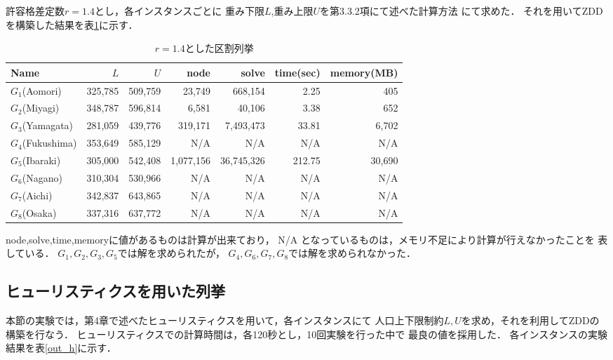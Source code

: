 許容格差定数$r=1.4$とし，各インスタンスごとに
重み下限$L$,重み上限$U$を第3.3.2項にて述べた計算方法
にて求めた．
それを用いてZDDを構築した結果を表\ref{out_r}に示す．

\begin{table}[htbp]
  \caption{$r=1.4$とした区割列挙}
  \label{out_r}
  \centering
  \begin{tabular}{l||r|r||r|r|r|r}
    \hline
    Name & $L$ & $U$ & node & solve & time(sec) & memory(MB) \\
    \hline \hline
    $G_1$(Aomori) & 325{,}785 & 509{,}759 & 23{,}749 & 668{,}154 & 2.25 & 405 \\
    $G_2$(Miyagi) & 348{,}787 & 596{,}814 & 6{,}581 & 40{,}106 & 3.38 & 652 \\
    $G_3$(Yamagata) & 281{,}059 & 439{,}776 & 319{,}171 & 7{,}493{,}473 & 33.81 & 6{,}702 \\
    $G_4$(Fukushima) & 353{,}649 & 585{,}129 & N/A & N/A & N/A & N/A \\
    $G_5$(Ibaraki) & 305{,}000 & 542{,}408 & 1{,}077{,}156 & 36{,}745{,}326 & 212.75 & 30{,}690 \\
    $G_6$(Nagano) & 310{,}304 & 530{,}966 & N/A & N/A & N/A & N/A \\
    $G_7$(Aichi) & 342{,}837 & 643{,}865 & N/A & N/A & N/A & N/A \\
    $G_8$(Osaka) & 337{,}316 & 637{,}772 & N/A & N/A & N/A & N/A \\
    \hline
  \end{tabular}
\end{table}

node,solve,time,memoryに値があるものは計算が出来ており，
N/A となっているものは，メモリ不足により計算が行えなかったことを
表している．
$G_1, G_2, G_3, G_5$では解を求められたが，
$G_4, G_6, G_7, G_8$では解を求められなかった．

\subsection{ヒューリスティクスを用いた列挙}

本節の実験では，第4章で述べたヒューリスティクスを用いて，各インスタンスにて
人口上下限制約$L, U$を求め，それを利用してZDDの構築を行なう．
ヒューリスティクスでの計算時間は，各120秒とし，10回実験を行った中で
最良の値を採用した．
各インスタンスの実験結果を表\ref{out_h}に示す．


